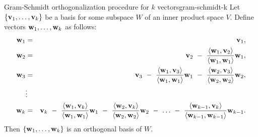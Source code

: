 \begin{proposition}{Gram-Schmidt orthogonalization procedure for $k$ vectors}{gram-schmidt-k}
  Let $\set{\vect{v}_1,\ldots,\vect{v}_k}$ be a basis for some subspace $W$
  of an inner product space $V$.%
  Define vectors
  $\vect{w}_1,\ldots,\vect{w}_k$ as follows:
  \begin{eqnarray*}
    \vect{w}_1
    &=& \vect{v}_1,
    \\
    \vect{w}_2
    &=& \vect{v}_2
        ~-~ \frac{\iprod{\vect{w}_1,\vect{v}_2}}{\iprod{\vect{w}_1,\vect{w}_1}}\vect{w}_1,
    \\
    \vect{w}_3
    &=& \vect{v}_3
        ~-~ \frac{\iprod{\vect{w}_1,\vect{v}_3}}{\iprod{\vect{w}_1,\vect{w}_1}}\vect{w}_1
        ~-~ \frac{\iprod{\vect{w}_2,\vect{v}_3}}{\iprod{\vect{w}_2,\vect{w}_2}}\vect{w}_2,
    \\
    &\vdots&
    \\
    \vect{w}_k
    &=& \vect{v}_k
        ~-~ \frac{\iprod{\vect{w}_1,\vect{v}_k}}{\iprod{\vect{w}_1,\vect{w}_1}}\vect{w}_1
        ~-~ \frac{\iprod{\vect{w}_2,\vect{v}_k}}{\iprod{\vect{w}_2,\vect{w}_2}}\vect{w}_2
        ~-~ \ldots
        ~-~ \frac{\iprod{\vect{w}_{k-1},\vect{v}_k}}{\iprod{\vect{w}_{k-1},\vect{w}_{k-1}}}\vect{w}_{k-1}.
  \end{eqnarray*}
  Then $\set{\vect{w}_1,\ldots,\vect{w}_k}$ is an orthogonal basis of $W$.
\end{proposition}

